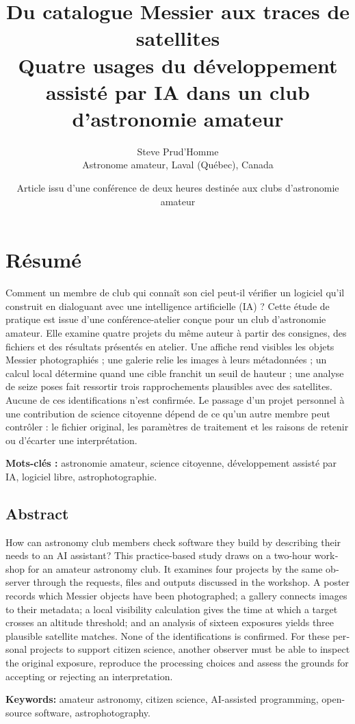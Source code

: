 \documentclass[11pt,letterpaper]{article}
\title{Du catalogue Messier aux traces de satellites\\[3pt]
\large Quatre usages du développement assisté par IA dans un club d'astronomie amateur}
\author{Steve Prud'Homme\\\small Astronome amateur, Laval (Québec), Canada}
\date{Article issu d'une conférence de deux heures destinée aux clubs d'astronomie amateur}
\begin{document}
\maketitle

\section*{Résumé}
Comment un membre de club qui connaît son ciel peut-il vérifier un logiciel qu'il construit en dialoguant avec une intelligence artificielle (IA) ? Cette étude de pratique est issue d'une conférence-atelier conçue pour un club d'astronomie amateur. Elle examine quatre projets du même auteur à partir des consignes, des fichiers et des résultats présentés en atelier. Une affiche rend visibles les objets Messier photographiés ; une galerie relie les images à leurs métadonnées ; un calcul local détermine quand une cible franchit un seuil de hauteur ; une analyse de seize poses fait ressortir trois rapprochements plausibles avec des satellites. Aucune de ces identifications n'est confirmée. Le passage d'un projet personnel à une contribution de science citoyenne dépend de ce qu'un autre membre peut contrôler : le fichier original, les paramètres de traitement et les raisons de retenir ou d'écarter une interprétation.

\noindent\textbf{Mots-clés :} astronomie amateur, science citoyenne, développement assisté par IA, logiciel libre, astrophotographie.

\begin{otherlanguage}{english}
\section*{Abstract}
How can astronomy club members check software they build by describing their needs to an AI assistant? This practice-based study draws on a two-hour workshop for an amateur astronomy club. It examines four projects by the same observer through the requests, files and outputs discussed in the workshop. A poster records which Messier objects have been photographed; a gallery connects images to their metadata; a local visibility calculation gives the time at which a target crosses an altitude threshold; and an analysis of sixteen exposures yields three plausible satellite matches. None of the identifications is confirmed. For these personal projects to support citizen science, another observer must be able to inspect the original exposure, reproduce the processing choices and assess the grounds for accepting or rejecting an interpretation.

\noindent\textbf{Keywords:} amateur astronomy, citizen science, AI-assisted programming, open-source software, astrophotography.
\end{otherlanguage}
\end{document}

